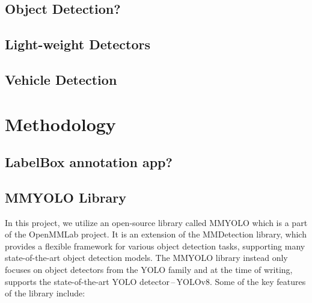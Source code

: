 

\section{Object Detection?}


\section{Light-weight Detectors}


\section{Vehicle Detection}





\chapter{Methodology}


\section{LabelBox annotation app?}


\section{MMYOLO Library}

In this project, we utilize an open-source library
called MMYOLO which is a part of the
OpenMMLab project. It is an extension of the MMDetection
library, which provides a flexible framework for various object detection tasks,
supporting many state-of-the-art object detection models. The MMYOLO library
instead only focuses on object detectors from the YOLO family and at the time of
writing, supports the state-of-the-art YOLO detector\,--\,YOLOv8. Some of the
key features of the library include:

